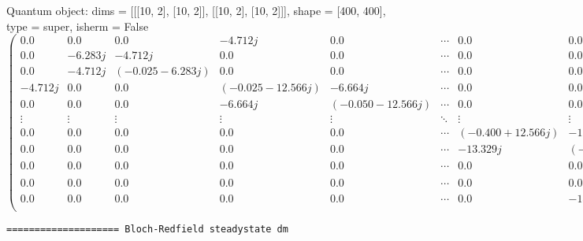 \documentclass{article}
\begin{document}
    Quantum object: dims = [[[10, 2], [10, 2]], [[10, 2], [10, 2]]], shape = [400, 400], type = super, isherm = False\begin{equation*}\begin{pmatrix}0.0 & 0.0 & 0.0 & -4.712j & 0.0 & \cdots & 0.0 & 0.0 & 0.0 & 0.0 & 0.0\\0.0 & -6.283j & -4.712j & 0.0 & 0.0 & \cdots & 0.0 & 0.0 & 0.0 & 0.0 & 0.0\\0.0 & -4.712j & (-0.025-6.283j) & 0.0 & 0.0 & \cdots & 0.0 & 0.0 & 0.0 & 0.0 & 0.0\\-4.712j & 0.0 & 0.0 & (-0.025-12.566j) & -6.664j & \cdots & 0.0 & 0.0 & 0.0 & 0.0 & 0.0\\0.0 & 0.0 & 0.0 & -6.664j & (-0.050-12.566j) & \cdots & 0.0 & 0.0 & 0.0 & 0.0 & 0.0\\\vdots & \vdots & \vdots & \vdots & \vdots & \ddots & \vdots & \vdots & \vdots & \vdots & \vdots\\0.0 & 0.0 & 0.0 & 0.0 & 0.0 & \cdots & (-0.400+12.566j) & -13.329j & 0.0 & 0.0 & 0.0\\0.0 & 0.0 & 0.0 & 0.0 & 0.0 & \cdots & -13.329j & (-0.425+12.566j) & 0.0 & 0.0 & -14.137j\\0.0 & 0.0 & 0.0 & 0.0 & 0.0 & \cdots & 0.0 & 0.0 & (-0.425+6.283j) & -14.137j & 0.0\\0.0 & 0.0 & 0.0 & 0.0 & 0.0 & \cdots & 0.0 & 0.0 & -14.137j & (-0.450+6.283j) & 0.0\\0.0 & 0.0 & 0.0 & 0.0 & 0.0 & \cdots & 0.0 & -14.137j & 0.0 & 0.0 & -0.450\\\end{pmatrix}\end{equation*}

    
    \begin{Verbatim}[commandchars=\\\{\}]
==================== Bloch-Redfield steadystate dm
    \end{Verbatim}
\end{document}
